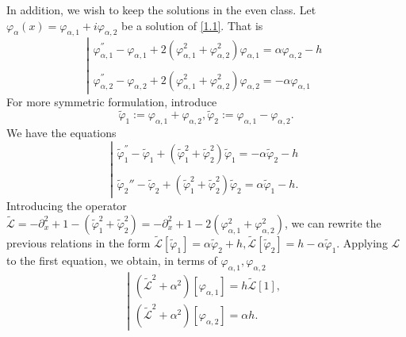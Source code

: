 \documentclass[12pt]{amsart}
\theoremstyle{definition}
\theoremstyle{remark}
\numberwithin{equation}{section}
\renewcommand{\(}{\left(}
\renewcommand{\)}{\right)}
\renewcommand{\[}{\left[}
\renewcommand{\]}{\right]}
\newcommand{\cl}{{\mathcal L}}
\newcommand{\al}{\alpha}
\newcommand{\vp}{\varphi}
\newcommand{\vpt}{\tilde{\vp}}
\newcommand{\tcl}{\tilde{\cl}}
\newcommand{\p}{\partial}
\begin{document}
 In addition, we wish to keep the solutions in the even class.
 Let   $\varphi_{\alpha}(x)=\varphi_{\alpha, 1}+i\varphi_{\alpha, 2}$ be  a solution of \eqref{1.1}.
 That is
 \begin{equation}
 \label{150}
 \left| \begin{array}{ll} \varphi_{\alpha,1}^{''}-\varphi_{\alpha,1}+2(\varphi_{\alpha,1}^2+\varphi_{\alpha, 2}^2)\varphi_{\alpha, 1}=\alpha\varphi_{\alpha, 2}-h \\
 \\
 \varphi_{\alpha,2}^{''}-\varphi_{\alpha,2}+2(\varphi_{\alpha,1}^2+\varphi_{\alpha, 2}^2)\varphi_{\alpha, 2}=-\alpha\varphi_{\alpha, 1}
 \end{array} \right.
 \end{equation}
For more symmetric formulation, introduce
$$
\vpt_1:= \varphi_{\alpha,1}+\varphi_{\alpha, 2}, \vpt_2:= \varphi_{\alpha,1}-\varphi_{\alpha, 2}.
$$
We have the equations
 \begin{equation}
 \label{151}
 \left| \begin{array}{ll} \vpt_1^{''}-\vpt_1+(\vpt_1^2+\vpt_2^2)\vpt_1=-\alpha\vpt_2-h \\
 \\
 \vpt_2''-\vpt_2+(\vpt_1^2+\vpt_2^2)\vpt_2=\al \vpt_1 - h.
 \end{array} \right.
 \end{equation}
Introducing the operator $\tcl=-\p_x^2+1-(\vpt_1^2+\vpt_2^2)=-\p_x^2+1-2 (\vp_{\al,1}^2+\vp_{\al,2}^2)$, we can rewrite the previous relations in the form
$\tcl[\vpt_1]=\al\vpt_2+h, \tcl[\vpt_2]=h-\al\vpt_1$. Applying $\cl$ to the first equation, we obtain,  in terms of $\vp_{\al,1}, \vp_{\al,2}$
 \begin{equation}
 \label{160}
 \left| \begin{array}{l}
 (\tcl^2+\al^2) [\vp_{\al,1}]=h\tcl[1], \\
 (\tcl^2+\al^2)[\vp_{\al,2}]=\al h.
 \end{array} \right.
 \end{equation}
\end{document}

